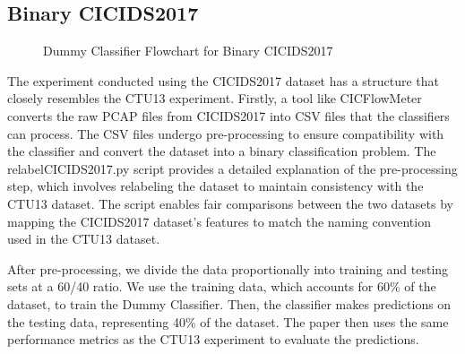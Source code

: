 \subsection{Binary CICIDS2017}\label{subsec:DummyClassifierBinaryCICIDS2017}

\begin{figure}[H]
\centering
{}
\caption{Dummy Classifier Flowchart for Binary CICIDS2017}\label{fig:DummyRandomFlowBinaryCICIDS2017}
\end{figure}

The experiment conducted using the CICIDS2017 dataset has a structure that closely resembles the CTU13 experiment. Firstly, a tool like CICFlowMeter~\cite{lashkari2017characterization} converts the raw PCAP files from CICIDS2017 into CSV files that the classifiers can process. The CSV files undergo pre-processing to ensure compatibility with the classifier and convert the dataset into a binary classification problem. The relabelCICIDS2017.py script provides a detailed explanation of the pre-processing step, which involves relabeling the dataset to maintain consistency with the CTU13 dataset. The script enables fair comparisons between the two datasets by mapping the CICIDS2017 dataset's features to match the naming convention used in the CTU13 dataset.

After pre-processing, we divide the data proportionally into training and testing sets at a 60/40 ratio. We use the training data, which accounts for 60\% of the dataset, to train the Dummy Classifier. Then, the classifier makes predictions on the testing data, representing 40\% of the dataset. The paper then uses the same performance metrics as the CTU13 experiment to evaluate the predictions.

